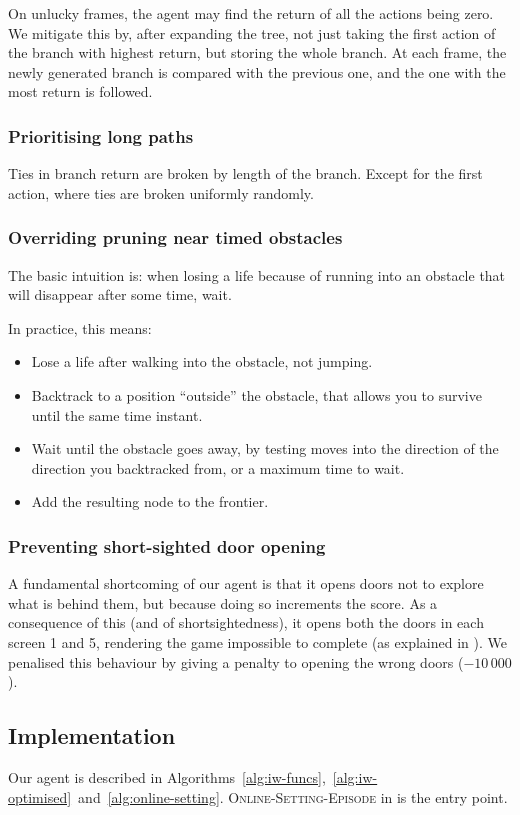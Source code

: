On unlucky frames, the agent may find the return of all the actions being zero.
We mitigate this by, after expanding the tree, not just taking the first action
of the branch with highest return, but storing the whole branch. At each frame,
the newly generated branch is compared with the previous one, and the one with
the most return is followed.

\subsubsection{Prioritising long paths}
Ties in branch return are broken by length of the branch. Except for the first
action, where ties are broken uniformly randomly.

\subsubsection{Overriding pruning near timed obstacles}
The basic intuition is: when losing a life because of running into an obstacle
that will disappear after some time, wait.

In practice, this means:
\begin{itemize}
  \item Lose a life after walking into the obstacle, not jumping.
  \item Backtrack to a position ``outside'' the obstacle, that allows you to
    survive until the same time instant.
  \item Wait until the obstacle goes away, by testing moves into the direction
    of the direction you backtracked from, or a maximum time to wait.
  \item Add the resulting node to the frontier.
\end{itemize}

\subsubsection{Preventing short-sighted door opening}
A fundamental shortcoming of our agent is that it opens doors not to explore
what is behind them, but because doing so increments the score. As a consequence
of this (and of shortsightedness), it opens both the doors in each screen 1 and
5, rendering the game impossible to complete (as explained in
). We penalised this behaviour by giving a penalty
to opening the wrong doors ($-10\,000$).

\subsection{Implementation\label{subsec:implementation-iw}}
Our agent is described in
Algorithms~\ref{alg:iw-funcs},~\ref{alg:iw-optimised}~and~\ref{alg:online-setting}.
\textsc{Online-Setting-Episode} in  is the entry
point.

